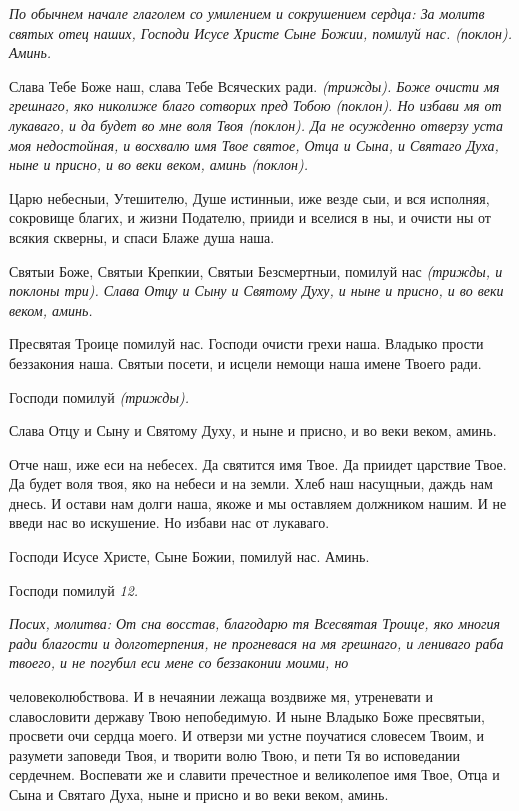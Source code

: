 \itshape По обычнем начале глаголем со умилением и сокрушением сердца:\normalfont{} За
молитв святых отец наших, Господи Исусе Христе Сыне Божии, помилуй
нас. \itshape (поклон)\normalfont{}. Аминь.


   Слава Тебе Боже наш, слава Тебе Всяческих ради. \itshape (трижды)\normalfont{}. Боже
очисти мя грешнаго, яко николиже благо сотворих пред Тобою \itshape (поклон)\normalfont{}. Но
избави мя от лукаваго, и да будет во мне воля Твоя \itshape (поклон)\normalfont{}. Да не
осужденно отверзу уста моя недостойная, и восхвалю имя Твое святое,
Отца и Сына, и Святаго Духа, ныне и присно, и во веки веком, аминь
\itshape (поклон)\normalfont{}.


   Царю небесныи, Утешителю, Душе истинныи, иже везде сыи,
и вся исполняя, сокровище благих, и жизни Подателю, прииди и
вселися в ны, и очисти ны от всякия скверны, и спаси Блаже душа
наша.


   Святыи Боже, Святыи Крепкии, Святыи Безсмертныи, помилуй нас
\itshape (трижды, и поклоны три)\normalfont{}. Слава Отцу и Сыну и Святому Духу, и ныне и
присно, и во веки веком, аминь.


   Пресвятая Троице помилуй нас. Господи очисти грехи наша. Владыко
прости беззакония наша. Святыи посети, и исцели немощи наша имене
Твоего ради.


   Господи помилуй \itshape (трижды)\normalfont{}.


   Слава Отцу и Сыну и Святому Духу, и ныне и присно, и во веки веком,
аминь.


   Отче наш, иже еси на небесех. Да святится имя Твое. Да приидет
царствие Твое. Да будет воля твоя, яко на небеси и на земли. Хлеб наш
насущныи, даждь нам днесь. И остави нам долги наша, якоже и мы
оставляем должником нашим. И не введи нас во искушение. Но избави нас от
лукаваго.


   Господи Исусе Христе, Сыне Божии, помилуй нас. Аминь.


   Господи помилуй \itshape 12\normalfont{}.


 \itshape Посих, молитва:\normalfont{} От сна восстав, благодарю тя Всесвятая Троице, яко
многия ради благости и долготерпения, не прогневася на мя грешнаго, и
лениваго раба твоего, и не погубил еси мене со беззаконии моими, но

человеколюбствова. И в нечаянии лежаща воздвиже мя, утреневати и
славословити державу Твою непобедимую. И ныне Владыко Боже
пресвятыи, просвети очи сердца моего. И отверзи ми устне поучатися
словесем Твоим, и разумети заповеди Твоя, и творити волю Твою, и пети Тя
во исповедании сердечнем. Воспевати же и славити пречестное и великолепое
имя Твое, Отца и Сына и Святаго Духа, ныне и присно и во веки веком,
аминь.


